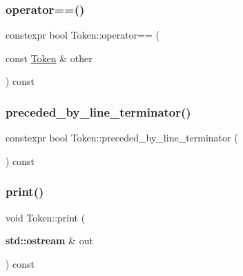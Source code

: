\mbox{\label{class_token_a12cec3cf4221ac78a43b9c06e0ae6e8b}} 
\subsubsection{\texorpdfstring{operator==()}{operator==()}}
{\footnotesize\ttfamily constexpr bool Token\+::operator== (\begin{DoxyParamCaption}\item[{const \hyperlink{class_token}{Token} \&}]{other }\end{DoxyParamCaption}) const\hspace{0.3cm}{\ttfamily [inline]}}

\mbox{\label{class_token_aec736aba84de102878db8605f8574e38}} 
\subsubsection{\texorpdfstring{preceded\+\_\+by\+\_\+line\+\_\+terminator()}{preceded\_by\_line\_terminator()}}
{\footnotesize\ttfamily constexpr bool Token\+::preceded\+\_\+by\+\_\+line\+\_\+terminator (\begin{DoxyParamCaption}{ }\end{DoxyParamCaption}) const\hspace{0.3cm}{\ttfamily [inline]}}

\mbox{\label{class_token_ae3e466fdaf072ec89d2c4bf78b91d5e9}} 
\subsubsection{\texorpdfstring{print()}{print()}}
{\footnotesize\ttfamily void Token\+::print (\begin{DoxyParamCaption}\item[{\textbf{ std\+::ostream} \&}]{out }\end{DoxyParamCaption}) const\hspace{0.3cm}{\ttfamily [inline]}}

\mbox{\label{class_token_af63a6600ca9c654e40bea24483b2226e}} 
